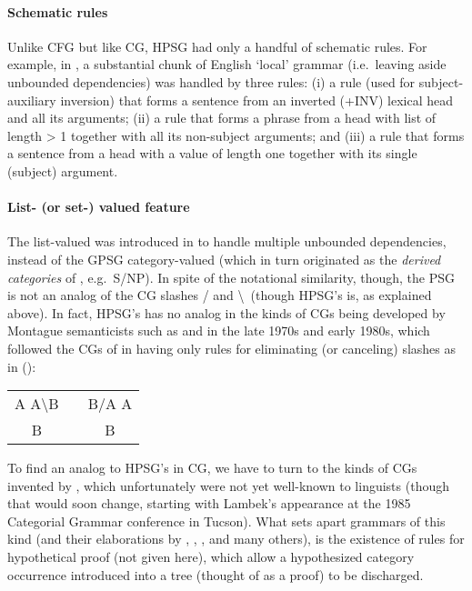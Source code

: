 \documentclass[output=paper
                ,modfonts
                ,nonflat
	        ,collection
	        ,collectionchapter
	        ,collectiontoclongg
 	        ,biblatex
                ,babelshorthands
                ,newtxmath
                ,draftmode
                ,colorlinks, citecolor=brown
]{./langsci/langscibook}
\begin{document}
\paragraph*{Schematic rules} Unlike CFG but like CG, HPSG had only a handful of schematic rules. For example, in \citet{Pollard85a-u}, a substantial chunk of English `local' grammar (i.e.~leaving aside unbounded dependencies) was handled by three rules: (i) a rule (used for subject-auxiliary inversion) that forms a sentence from an inverted (+INV) lexical head and all its arguments; (ii) a rule that forms a phrase from a head with \subcat list of length > 1 together with all its non-subject arguments; and (iii) a rule that forms a sentence from a head with a \subcat value of length one together with its single (subject) argument.

\paragraph*{List- (or set-) valued \slasch feature} The list-valued \slasch was introduced in \citet{Pollard85a-u} to handle multiple unbounded dependencies, instead of the GPSG category-valued \slasch (which in turn originated as the \emph{derived categories} of  \citet{Gazdar81a}, e.g.~S/NP). In spite of the notational similarity, though, the PSG \slasch is not an analog of the CG slashes / and \textbackslash \ (though HPSG's \subcat is, as explained above). In fact, HPSG's \slasch has no analog in the kinds of CGs being developed by Montague semanticists such as \citet{Bach79a,Bach80a} and \citet{Dowty82a-u} in the late 1970s and early 1980s, which followed the CGs of \citet{Bar-Hillel54-u} in having only rules for eliminating (or canceling) slashes as in ():

\ea
\begin{tabular}[t]{ccc}
A A{\textbackslash}B  & &     B/A A \\ \cline{1-1} \cline{3-3}
B & & B 
\end{tabular}
\z

\noindent
To find an analog to HPSG's \slasch in CG, we have to turn to the kinds of CGs invented by \citet{Lambek1958}, which unfortunately were not yet well-known to linguists (though that would soon change, starting with Lambek's appearance at the 1985 Categorial Grammar conference in Tucson). What sets apart grammars 
of this kind (and their elaborations by \citet{Moortgat89a-u}, \citet{OBW88a-ed}, \citet{Morrill94a-u}, and many others), is the existence of rules for hypothetical proof (not given here), which allow a hypothesized category occurrence introduced into a tree (thought of as a proof) to be discharged. 
\end{document}
